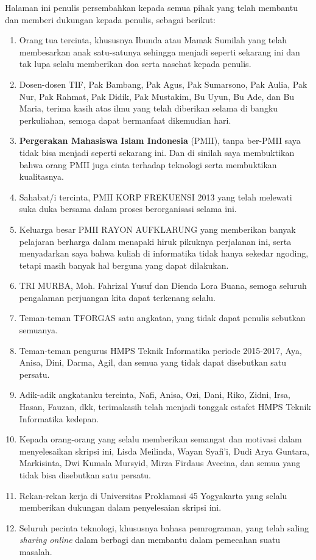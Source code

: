 \documentclass{jtetiskripsi}
\begin{document}
\acknowledgment
Halaman ini penulis persembahkan kepada semua pihak yang telah membantu dan memberi dukungan kepada penulis, sebagai berikut:
\begin{enumerate}
    \itemsep0em
    \item Orang tua tercinta, khususnya Ibunda atau Mamak Sumilah yang telah membesarkan anak satu-satunya sehingga menjadi seperti sekarang ini dan tak lupa selalu memberikan doa serta nasehat kepada penulis.
    \item Dosen-dosen TIF, Pak Bambang, Pak Agus, Pak Sumarsono, Pak Aulia, Pak Nur, Pak Rahmat, Pak Didik, Pak Mustakim, Bu Uyun, Bu Ade, dan Bu Maria, terima kasih atas ilmu yang telah diberikan selama di bangku perkuliahan, semoga dapat bermanfaat dikemudian hari.
    \item \textbf{Pergerakan Mahasiswa Islam Indonesia} (PMII), tanpa ber-PMII saya tidak bisa menjadi seperti sekarang ini. Dan di sinilah saya membuktikan bahwa orang PMII juga cinta terhadap teknologi serta membuktikan kualitasnya.
    \item Sahabat/i tercinta, PMII KORP FREKUENSI 2013 yang telah melewati suka duka bersama dalam proses berorganisasi selama ini.
    \item Keluarga besar PMII RAYON AUFKLARUNG yang memberikan banyak pelajaran berharga dalam menapaki hiruk pikuknya perjalanan ini, serta menyadarkan saya bahwa kuliah di informatika tidak hanya sekedar ngoding, tetapi masih banyak hal berguna yang dapat dilakukan.
    \item TRI MURBA, Moh. Fahrizal Yusuf dan Dienda Lora Buana, semoga seluruh pengalaman perjuangan kita dapat terkenang selalu.
    \item Teman-teman TFORGAS satu angkatan, yang tidak dapat penulis sebutkan semuanya.
    \item Teman-teman pengurus HMPS Teknik Informatika periode 2015-2017, Aya, Anisa, Dini, Darma, Agil, dan semua yang tidak dapat disebutkan satu persatu.
    \item Adik-adik angkatanku tercinta, Nafi, Anisa, Ozi, Dani, Riko, Zidni, Irsa, Hasan, Fauzan, dkk, terimakasih telah menjadi tonggak estafet HMPS Teknik Informatika kedepan.
    \item Kepada orang-orang yang selalu memberikan semangat dan motivasi dalam menyelesaikan skripsi ini, Lisda Meilinda, Wayan Syafi'i, Dudi Arya Guntara, Markisinta, Dwi Kumala Mursyid, Mirza Firdaus Avecina, dan semua yang tidak bisa disebutkan satu persatu.
    \item Rekan-rekan kerja di Universitas Proklamasi 45 Yogyakarta yang selalu memberikan dukungan dalam penyelesaian skripsi ini.
    \item Seluruh pecinta teknologi, khususnya bahasa pemrograman, yang telah saling \emph{sharing online} dalam berbagi dan membantu dalam pemecahan suatu masalah.
\end{enumerate}
\end{document}
